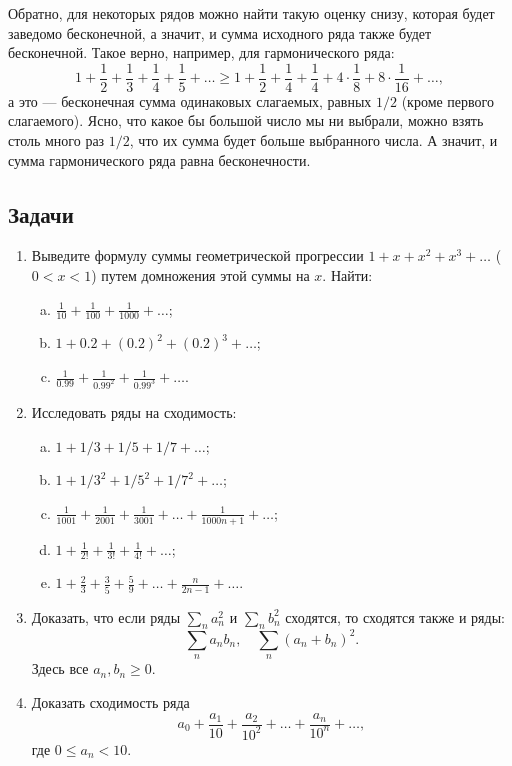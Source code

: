 Обратно, для некоторых рядов можно найти такую оценку снизу, которая будет заведомо бесконечной, а значит, и сумма исходного ряда также будет бесконечной. Такое верно, например, для гармонического ряда:
$$
1+\frac{1}{2}+\frac{1}{3}+\frac{1}{4}+\frac{1}{5}+\dots \ge 
1+\frac{1}{2}+\frac{1}{4}+\frac{1}{4}+4\cdot\frac{1}{8}+8\cdot\frac{1}{16}+\dots,
$$
а это --- бесконечная сумма одинаковых слагаемых, равных $1/2$ (кроме первого слагаемого). Ясно, что какое бы большой число мы ни выбрали, можно взять столь много раз $1/2$, что их сумма будет больше выбранного числа. А значит, и сумма гармонического ряда равна бесконечности.

\subsection*{Задачи}

\begin{enumerate}
\item Выведите формулу суммы геометрической прогрессии $1+x+x^2+x^3+\dots$ ($0<x<1$) путем домножения этой суммы на $x$. Найти:
\begin{enumerate}[a)]
\item $\displaystyle \frac{1}{10}+\frac{1}{100}+\frac{1}{1000}+\dots$;
\item $\displaystyle 1+0.2+(0.2)^2+(0.2)^3+\dots$;
\item $\displaystyle \frac{1}{0.99}+\frac{1}{0.99^2}+\frac{1}{0.99^3}+\dots$.
\end{enumerate}
\item Исследовать ряды на сходимость:
\begin{enumerate}[a)]
\item $1+1/3+1/5+1/7+\dots$;
\item $1+1/3^2+1/5^2+1/7^2+\dots$;
\item $\displaystyle \frac{1}{1001}+\frac{1}{2001}+\frac{1}{3001}+\dots+\frac{1}{1000n+1}+\dots$;
\item $\displaystyle 1+\frac{1}{2!}+\frac{1}{3!}+\frac{1}{4!}+\dots$;
\item $\displaystyle 1+\frac{2}{3}+\frac{3}{5}+\frac{5}{9}+\dots+\frac{n}{2n-1}+\dots$.
\end{enumerate}
\item Доказать, что если ряды $\displaystyle \sum_na_n^2$ и $\displaystyle \sum_nb_n^2$ сходятся, то сходятся также и ряды:
$$
\sum_na_nb_n,\quad \sum_n(a_n+b_n)^2.
$$
Здесь все $a_n,b_n\ge 0$.
\item Доказать сходимость ряда
$$
a_0+\frac{a_1}{10}+\frac{a_2}{10^2}+\dots+\frac{a_n}{10^n}+\dots,
$$
где $0\le a_n<10$.
\end{enumerate}





